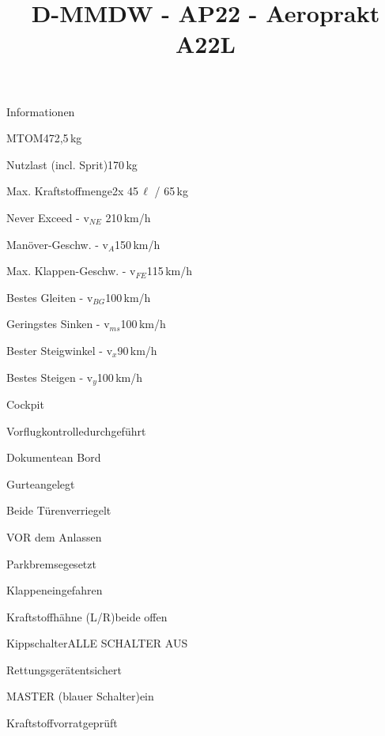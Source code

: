 \def\papersize{4}

\usepackage{amsmath}  
\usepackage{amssymb}  



\title{D-MMDW  -  AP22  -  Aeroprakt A22L}

\begin{checklist}{Informationen}
 	\item{MTOM}{472,5\,kg}
  	\item{Nutzlast (incl. Sprit)}{170\,kg}
  	\item{Max. Kraftstoffmenge}{2x 45\,${\ell}$ / 65\,kg}
 	  \item{Never Exceed  -  v$_{NE}$ }{210\,km/h}
	  \item{Manöver-Geschw.  -  v$_{A}$}{150\,km/h}
	  \item{Max. Klappen-Geschw.  -  v$_{FE}$}{115\,km/h}
	  \item{Bestes Gleiten  -  v$_{BG}$}{100\,km/h}
	  \item{Geringstes Sinken  -  v$_{ms}$}{100\,km/h}
	  \item{Bester Steigwinkel - v$_{x}$}{90\,km/h}
	  \item{Bestes Steigen - v$_{y}$}{100\,km/h}
\end{checklist}

\begin{checklist}{Cockpit}
	\item{Vorflugkontrolle}{durchgeführt}
	\item{Dokumente}{an Bord}
	\item{Gurte}{angelegt}
	\item{Beide Türen}{verriegelt}
\end{checklist}




\begin{checklist}{VOR dem Anlassen}
	\item{Parkbremse}{gesetzt}
	\item{Klappen}{eingefahren}
	\item{Kraftstoffhähne (L/R)}{beide offen}
	\item{Kippschalter}{ALLE SCHALTER AUS}
	\item{Rettungsgerät}{entsichert}
	\item{MASTER (blauer Schalter)}{ein}
	\item{Kraftstoffvorrat}{geprüft}
\end{checklist}

